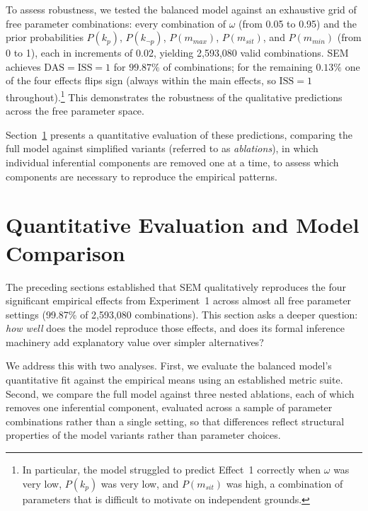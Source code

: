 \documentclass[12pt,a4paper]{article}
\begin{document}
To assess robustness, we tested the balanced model against an exhaustive grid of
free parameter combinations: every combination of $\omega$ (from 0.05 to 0.95)
and the prior probabilities $P(k_p)$, $P(k_{\neg p})$, $P(m_{max})$,
$P(m_{sit})$, and $P(m_{min})$ (from 0 to 1), each in increments of 0.02,
yielding 2,593,080 valid combinations. 
SEM achieves $\mathrm{DAS} = \mathrm{ISS} = 1$ for $99.87\%$ of combinations; for
the remaining $0.13\%$ one of the four effects flips sign (always within the main
effects, so $\mathrm{ISS} = 1$ throughout).\footnote{In particular, the model struggled to predict
Effect~1 correctly when $\omega$ was very low, $P(k_p)$ was very low, and
$P(m_{sit})$ was high, a combination of parameters that is difficult to
motivate on independent grounds.} This demonstrates the robustness of the
qualitative predictions across the free parameter space.

Section~\ref{sec:evaluation} presents a quantitative evaluation of these
predictions, comparing the full model against simplified variants (referred to
as \emph{ablations}), in which individual inferential components are removed
one at a time, to assess which components are necessary to reproduce the
empirical patterns.




\section{Quantitative Evaluation and Model Comparison}
\label{sec:evaluation}

The preceding sections established that SEM qualitatively reproduces the four
significant empirical effects from Experiment~1 across almost all free parameter
settings (99.87\% of 2,593,080 combinations). This section asks a deeper
question: \emph{how well} does the model reproduce those effects, and does its
formal inference machinery add explanatory value over simpler alternatives?

We address this with two analyses. First, we evaluate the balanced model's
quantitative fit against the empirical means using an established metric suite.
Second, we compare the full model against three nested ablations, each of which
removes one inferential component, evaluated across a sample of parameter
combinations rather than a single setting, so that differences reflect structural
properties of the model variants rather than parameter choices.
\end{document}
